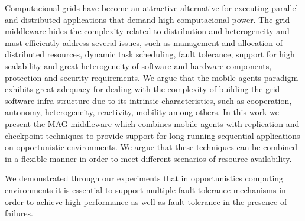 \documentclass[times, 10pt, twocolumn]{article}
\begin{document}
Computacional grids have become an attractive alternative for executing
parallel and distributed applications that demand high computacional power.
The grid middleware hides the complexity related to distribution and
heterogeneity and must efficiently address several issues, such as management
and allocation of distributed resources, dynamic task scheduling, fault
tolerance, support for high scalability and great heterogeneity of software and
hardware components, protection and security requirements. We argue that the
mobile agents paradigm exhibits great adequacy for dealing with the complexity
of building the grid software infra-structure due to its intrinsic
characteristics, such as cooperation, autonomy, heterogeneity, reactivity,
mobility among others. In this work we present the MAG middleware which
combines mobile agents with replication and checkpoint techniques to provide
support for long running sequential applications on opportunistic environments.
We argue that these techniques can be combined in a flexible manner in order to
meet different scenarios of resource availability.

We demonstrated through our experiments that in opportunistics computing
environments it is essential to support multiple fault tolerance mechanisms in
order to achieve high performance as well as fault tolerance in the presence of
failures.



\end{document}
